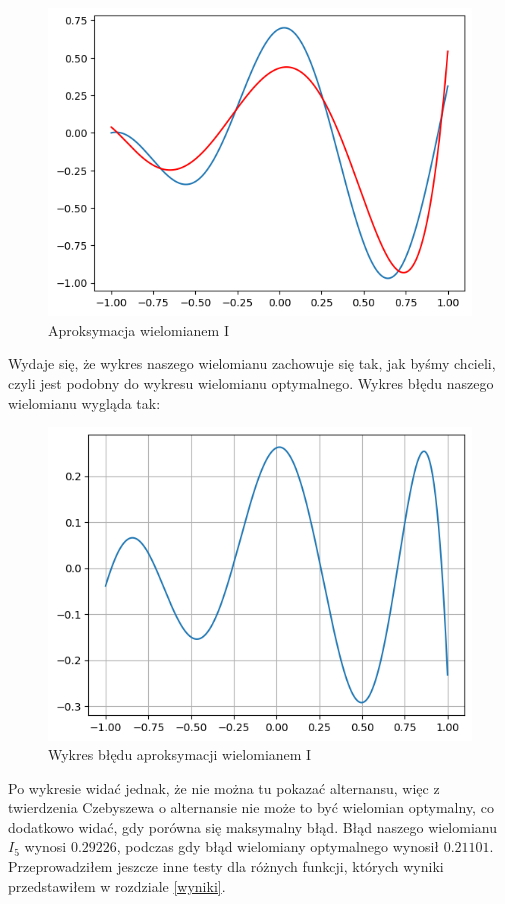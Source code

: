 \documentclass[11pt,wide]{mwart}
\begin{document}
\begin{figure}[H]
	\begin{center}
	\includegraphics[scale=0.7]{przyklad_I}
	\end{center}
	\caption{Aproksymacja wielomianem I}
\end{figure}
\noindent Wydaje się, że wykres naszego wielomianu zachowuje się tak, jak byśmy chcieli, czyli jest podobny do wykresu wielomianu optymalnego. Wykres błędu naszego wielomianu wygląda tak: \\
\begin{figure}[H]
	\begin{center}
	\includegraphics[scale=0.7]{blad_I}
	\end{center}
	\caption{Wykres błędu aproksymacji wielomianem I}
\end{figure}
\noindent Po wykresie widać jednak, że nie można tu pokazać alternansu, więc z twierdzenia Czebyszewa o alternansie nie może to być wielomian optymalny, co dodatkowo widać, gdy porówna się maksymalny błąd. Błąd naszego wielomianu $I_5$ wynosi $0.29226$, podczas gdy błąd wielomiany optymalnego wynosił $0.21101$. Przeprowadziłem jeszcze inne testy dla różnych funkcji, których wyniki przedstawiłem w rozdziale \ref{wyniki}.
\end{document}
